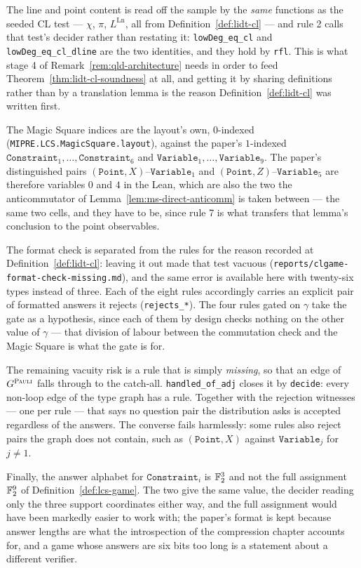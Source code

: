 The line and point content is read off the sample by the \emph{same} functions as the seeded CL
test --- $\chi$, $\pi$, $L^{\mathrm{Ln}}$, all from Definition~\ref{def:lidt-cl} --- and rule 2
calls that test's decider rather than restating it: \texttt{lowDeg\_eq\_cl} and
\texttt{lowDeg\_eq\_cl\_dline} are the two identities, and they hold by \texttt{rfl}. This is
what stage 4 of Remark~\ref{rem:qld-architecture} needs in order to feed
Theorem~\ref{thm:lidt-cl-soundness} at all, and getting it by sharing definitions rather than
by a translation lemma is the reason Definition~\ref{def:lidt-cl} was written first.

The Magic Square indices are the layout's own, $0$-indexed
(\texttt{MIPRE.LCS.MagicSquare.layout}), against the paper's $1$-indexed
$\mathtt{Constraint}_1, \ldots, \mathtt{Constraint}_6$ and
$\mathtt{Variable}_1, \ldots, \mathtt{Variable}_9$. The paper's distinguished pairs
$(\mathtt{Point}, X)$--$\mathtt{Variable}_1$ and $(\mathtt{Point}, Z)$--$\mathtt{Variable}_5$
are therefore variables $0$ and $4$ in the Lean, which are also the two the anticommutator of
Lemma~\ref{lem:ms-direct-anticomm} is taken between --- the same two cells, and they have to
be, since rule 7 is what transfers that lemma's conclusion to the point observables.

The format check is separated from the rules for the reason recorded at
Definition~\ref{def:lidt-cl}: leaving it out made that test vacuous
(\texttt{reports/clgame-format-check-missing.md}), and the same error is available here with
twenty-six types instead of three. Each of the eight rules accordingly carries an explicit pair
of formatted answers it rejects (\texttt{rejects\_*}). The four rules gated on $\gamma$ take
the gate as a hypothesis, since each of them by design checks nothing on the other value of
$\gamma$ --- that division of labour between the commutation check and the Magic Square is what
the gate is for.

The remaining vacuity risk is a rule that is simply \emph{missing}, so that an edge of
$G^{\textsc{Pauli}}$ falls through to the catch-all. \texttt{handled\_of\_adj} closes it by
\texttt{decide}: every non-loop edge of the type graph has a rule. Together with the rejection
witnesses --- one per rule --- that says no question pair the distribution asks is accepted
regardless of the answers. The converse fails harmlessly: some rules also reject pairs the
graph does not contain, such as $(\mathtt{Point}, X)$ against $\mathtt{Variable}_j$ for
$j \neq 1$.

Finally, the answer alphabet for $\mathtt{Constraint}_i$ is $\mathbb{F}_2^3$ and not the full
assignment $\mathbb{F}_2^9$ of Definition~\ref{def:lcs-game}. The two give the same value, the decider
reading only the three support coordinates either way, and the full assignment would have been
markedly easier to work with; the paper's format is kept because answer lengths are what the
introspection of the compression chapter accounts for, and a game whose answers are six
bits too long is a statement about a different verifier.

